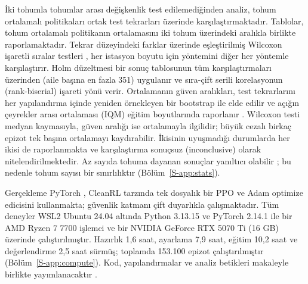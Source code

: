 İki tohumla tohumlar arası değişkenlik test edilemediğinden analiz, tohum ortalamalı politikaları ortak test tekrarları üzerinde karşılaştırmaktadır.
Tablolar, tohum ortalamalı politikanın ortalamasını iki tohum üzerindeki aralıkla birlikte raporlamaktadır.
Tekrar düzeyindeki farklar üzerinde eşleştirilmiş Wilcoxon işaretli sıralar testleri \cite{wilcoxon1945individual}, her istasyon boyutu için \method{} yöntemini diğer her yöntemle karşılaştırır.
Holm düzeltmesi bir sonuç tablosunun tüm karşılaştırmaları üzerinden (aile başına en fazla 351) uygulanır ve sıra-çift serili korelasyonun (rank-biserial) işareti yönü verir.
Ortalamanın güven aralıkları, test tekrarlarını her yapılandırma içinde yeniden örnekleyen bir bootstrap ile elde edilir ve açığın çeyrekler arası ortalaması (IQM) eğitim boyutlarında raporlanır \cite{agarwal2021deep}.
Wilcoxon testi medyan kaymasıyla, güven aralığı ise ortalamayla ilgilidir; büyük cezalı birkaç epizot tek başına ortalamayı kaydırabilir.
İkisinin uyuşmadığı durumlarda her ikisi de raporlanmakta ve karşılaştırma sonuçsuz (inconclusive) olarak nitelendirilmektedir.
Az sayıda tohuma dayanan sonuçlar yanıltıcı olabilir \cite{henderson2018deep}; bu nedenle tohum sayısı bir sınırlılıktır (Bölüm~\ref{S-app:stats}).

Gerçekleme PyTorch \cite{paszke2019pytorch}, CleanRL tarzında \cite{huang2022cleanrl} tek dosyalık bir PPO ve Adam optimize edicisini \cite{kingma2015adam} kullanmakta; güvenlik katmanı çift duyarlıkla çalışmaktadır.
Tüm deneyler WSL2 Ubuntu 24.04 altında Python 3.13.15 ve PyTorch 2.14.1 ile bir AMD Ryzen 7 7700 işlemci ve bir NVIDIA GeForce RTX 5070 Ti (16 GB) üzerinde çalıştırılmıştır.
Hazırlık 1,6 saat, ayarlama 7,9 saat, eğitim 10,2 saat ve değerlendirme 2,5 saat sürmüş; toplamda 153.100 epizot çalıştırılmıştır (Bölüm~\ref{S-app:compute}).
Kod, yapılandırmalar ve analiz betikleri makaleyle birlikte yayımlanacaktır .
